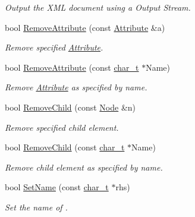 \begin{DoxyCompactItemize}
\begin{DoxyCompactList}\small\item\em Output the XML document using a Output Stream. \item\end{DoxyCompactList}\item 
bool \hyperlink{classMezzanine_1_1xml_1_1Node_aca08c75bcb373fca5d96911d5373bc47}{RemoveAttribute} (const \hyperlink{classMezzanine_1_1xml_1_1Attribute}{Attribute} \&a)
\begin{DoxyCompactList}\small\item\em Remove specified \hyperlink{classMezzanine_1_1xml_1_1Attribute}{Attribute}. \item\end{DoxyCompactList}\item 
bool \hyperlink{classMezzanine_1_1xml_1_1Node_a543ae590b37d10e24d77ae97af762541}{RemoveAttribute} (const \hyperlink{namespaceMezzanine_1_1xml_a29b8a47c179e9895c4e9e66c45d1dbbc}{char\_\-t} $\ast$Name)
\begin{DoxyCompactList}\small\item\em Remove \hyperlink{classMezzanine_1_1xml_1_1Attribute}{Attribute} as specified by name. \item\end{DoxyCompactList}\item 
bool \hyperlink{classMezzanine_1_1xml_1_1Node_adccef0985791506dc216f57cf6d46546}{RemoveChild} (const \hyperlink{classMezzanine_1_1xml_1_1Node}{Node} \&n)
\begin{DoxyCompactList}\small\item\em Remove specified child element. \item\end{DoxyCompactList}\item 
bool \hyperlink{classMezzanine_1_1xml_1_1Node_abac64ec627dbc59dbb8356620b2e6216}{RemoveChild} (const \hyperlink{namespaceMezzanine_1_1xml_a29b8a47c179e9895c4e9e66c45d1dbbc}{char\_\-t} $\ast$Name)
\begin{DoxyCompactList}\small\item\em Remove child element as specified by name. \item\end{DoxyCompactList}\item 
bool \hyperlink{classMezzanine_1_1xml_1_1Node_a486049e5b7dc8368f81d7ed536ea0556}{SetName} (const \hyperlink{namespaceMezzanine_1_1xml_a29b8a47c179e9895c4e9e66c45d1dbbc}{char\_\-t} $\ast$rhs)
\begin{DoxyCompactList}\small\item\em Set the name of . \item\end{DoxyCompactList}\item 

\end{DoxyCompactItemize}

